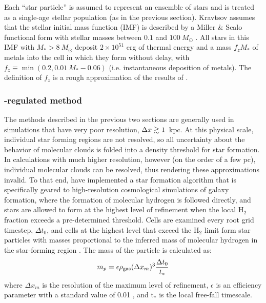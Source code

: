 Each ``star particle'' is assumed to represent an ensemble of stars
and is treated as a single-age stellar population (as in the previous
section).  Kravtsov assumes that the stellar initial mass function (IMF) is described by a Miller \&
Scalo functional form with stellar masses between $0.1$ and
$100~M_\odot$ \citep{1979ApJS...41..513M}.  All stars in this IMF with
$M_* > 8~M_\odot$ deposit $2 \times 10^{51}$ erg of thermal energy
and a mass $f_z M_*$ of metals into the cell in which they form
without delay, with $f_z \equiv \min(0.2, 0.01~M_*-0.06)$
(i.e. instantaneous deposition of metals).  The definition of $f_z$ is
a rough approximation of the results of \citet{1995ApJS..101..181W}.


\subsubsection{\HH-regulated method}
\label{sec:starform_H2reg}

The methods described in the previous two sections are generally used
in simulations that have very poor resolution, $\Delta x \gtrsim 1$~kpc.
At this physical scale, individual star forming regions are not
resolved, so all uncertainty about the behavior of molecular clouds is
folded into a density threshold for star formation.  In calculations
with much higher resolution, however (on the order of a few pc), individual
molecular clouds can be resolved, thus rendering these approximations
invalid.  To that end, \citet{2012ApJ...749...36K} have implemented
a star formation algorithm that is specifically geared to
high-resolution cosmological simulations of galaxy formation, where
the formation of molecular hydrogen is followed directly, and stars
are allowed to form at the highest level of refinement when the local
H$_2$ fraction exceeds a pre-determined threshold.  Cells are examined
every root grid timestep, $\Delta t_0$, and cells at the highest level
that exceed the H$_2$ limit form star particles with masses
proportional to the inferred mass of molecular hydrogen in the
star-forming region
\citep{2008ApJ...689..865K,2009ApJ...693..216K,2010ApJ...709..308M}.
The mass of the particle is calculated as:
\begin{equation} 
m_p = \epsilon \rho_{\rm gas} (\Delta x_{m})^3 \frac{\Delta t_0}{t_*}
\end{equation}
where $\Delta x_{m}$ is the resolution of the maximum level of
refinement, $\epsilon$ is an efficiency parameter with a standard
value of 0.01 \citep[as motivated by][]{2007ApJ...654..304K}, and
t$_*$ is the local free-fall timescale.

